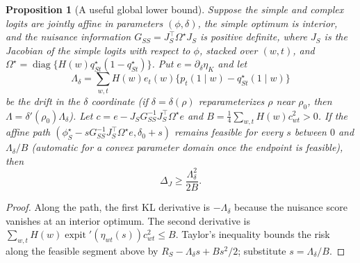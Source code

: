 \documentclass[11pt,letterpaper]{article}
\theoremstyle{plain}
\newtheorem{proposition}[theorem]{Proposition}
\theoremstyle{definition}
\newcommand{\sig}{\operatorname{expit}}
\begin{document}
\begin{proposition}[A useful global lower bound]\label{prop:bound}
Suppose the simple and complex logits are jointly affine in parameters $(\phi,\delta)$, the simple optimum is interior, and the nuisance information $G_{SS}=J_S^\top\Omega^\star J_S$ is positive definite, where $J_S$ is the Jacobian of the simple logits with respect to $\phi$, stacked over $(w,t)$, and $\Omega^\star=\operatorname{diag}\{H(w)q_{St}^\star(1-q_{St}^\star)\}$. Put $e=\partial_\delta\eta_K$ and let
\[
\Lambda_\delta=\sum_{w,t}H(w)e_t(w)\{p_t(1\mid w)-q_{St}^\star(1\mid w)\}
\]
be the drift in the $\delta$ coordinate (if $\delta=\delta(\rho)$ reparameterizes $\rho$ near $\rho_0$, then $\Lambda=\delta'(\rho_0)\Lambda_\delta$). Let $c=e-J_SG_{SS}^{-1}J_S^\top\Omega^\star e$ and $B=\tfrac14\sum_{w,t}H(w)c_{wt}^2>0$. If the affine path $(\phi_S^\star-sG_{SS}^{-1}J_S^\top\Omega^\star e,\delta_0+s)$ remains feasible for every $s$ between $0$ and $\Lambda_\delta/B$ (automatic for a convex parameter domain once the endpoint is feasible), then
\[
\Delta_J\ge \frac{\Lambda_\delta^2}{2B}.
\]
\end{proposition}
\begin{proof}
Along the path, the first KL derivative is $-\Lambda_\delta$ because the nuisance score vanishes at an interior optimum. The second derivative is $\sum_{w,t}H(w)\sig'(\eta_{wt}(s))c_{wt}^2\le B$. Taylor's inequality bounds the risk along the feasible segment above by $R_S-\Lambda_\delta s+Bs^2/2$; substitute $s=\Lambda_\delta/B$.
\end{proof}
\end{document}
